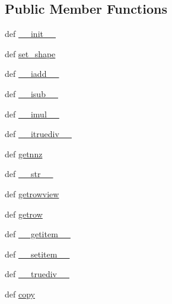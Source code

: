 \subsection*{Public Member Functions}
\begin{DoxyCompactItemize}
\item 
def \hyperlink{classscipy_1_1sparse_1_1lil_1_1lil__matrix_afda75424c8e45ae17a4d89704e9834d5}{\+\_\+\+\_\+init\+\_\+\+\_\+}
\item 
def \hyperlink{classscipy_1_1sparse_1_1lil_1_1lil__matrix_a946f28e67b392383bf490004bd661522}{set\+\_\+shape}
\item 
def \hyperlink{classscipy_1_1sparse_1_1lil_1_1lil__matrix_ad64a163850ef933f94ebd158b8920e0a}{\+\_\+\+\_\+iadd\+\_\+\+\_\+}
\item 
def \hyperlink{classscipy_1_1sparse_1_1lil_1_1lil__matrix_a42cdcf06aeadd8ea8b11f63b0e091ba0}{\+\_\+\+\_\+isub\+\_\+\+\_\+}
\item 
def \hyperlink{classscipy_1_1sparse_1_1lil_1_1lil__matrix_aa152fb95eff4c8c34f0adeafad868edd}{\+\_\+\+\_\+imul\+\_\+\+\_\+}
\item 
def \hyperlink{classscipy_1_1sparse_1_1lil_1_1lil__matrix_a71cb296c964cf231cb71699f9bac8e87}{\+\_\+\+\_\+itruediv\+\_\+\+\_\+}
\item 
def \hyperlink{classscipy_1_1sparse_1_1lil_1_1lil__matrix_ab60b3442a0e012f5329548da3ede0621}{getnnz}
\item 
def \hyperlink{classscipy_1_1sparse_1_1lil_1_1lil__matrix_a4c8744f3d9fa43356b4f6c5500f28d67}{\+\_\+\+\_\+str\+\_\+\+\_\+}
\item 
def \hyperlink{classscipy_1_1sparse_1_1lil_1_1lil__matrix_a770d5f04730094d8ce7279ea4ccac188}{getrowview}
\item 
def \hyperlink{classscipy_1_1sparse_1_1lil_1_1lil__matrix_aa184a6ba5f621558c505cb9ea568d68f}{getrow}
\item 
def \hyperlink{classscipy_1_1sparse_1_1lil_1_1lil__matrix_a140f92ec024e521c2dcfbbb7b7c7a516}{\+\_\+\+\_\+getitem\+\_\+\+\_\+}
\item 
def \hyperlink{classscipy_1_1sparse_1_1lil_1_1lil__matrix_ae9a36a06d96a9c4ea8d47f393449f559}{\+\_\+\+\_\+setitem\+\_\+\+\_\+}
\item 
def \hyperlink{classscipy_1_1sparse_1_1lil_1_1lil__matrix_a8494422be67eb16debdade51efd96faa}{\+\_\+\+\_\+truediv\+\_\+\+\_\+}
\item 
def \hyperlink{classscipy_1_1sparse_1_1lil_1_1lil__matrix_a444b815627892f59f4036ce9d2f10140}{copy}
\item 

\end{DoxyCompactItemize}
